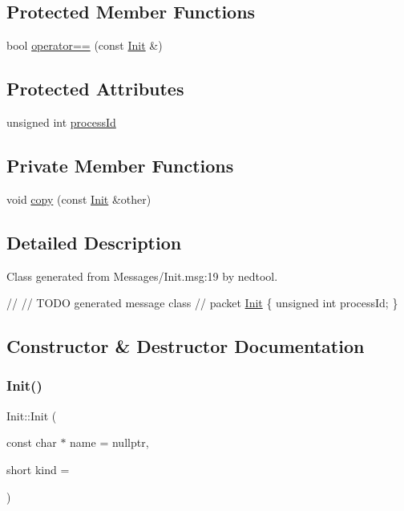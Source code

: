 \subsection*{Protected Member Functions}
\begin{DoxyCompactItemize}
\item 
bool \hyperlink{class_init_a474b7c9ffdf72a6b2b58558ce68bb03e}{operator==} (const \hyperlink{class_init}{Init} \&)
\end{DoxyCompactItemize}
\subsection*{Protected Attributes}
\begin{DoxyCompactItemize}
\item 
unsigned int \hyperlink{class_init_a3adbaa4c454127a34eaab69297b44585}{process\+Id}
\end{DoxyCompactItemize}
\subsection*{Private Member Functions}
\begin{DoxyCompactItemize}
\item 
void \hyperlink{class_init_a045745f591e312608e5ee3639f4459ba}{copy} (const \hyperlink{class_init}{Init} \&other)
\end{DoxyCompactItemize}


\subsection{Detailed Description}
Class generated from {\ttfamily Messages/\+Init.\+msg\+:19} by nedtool. 


\begin{DoxyPre}
//
// TODO generated message class
//
packet \hyperlink{class_init}{Init}
\{
    unsigned int processId;
\}
\end{DoxyPre}
 

\subsection{Constructor \& Destructor Documentation}
\mbox{\label{class_init_a763a386107f8ea21acfd24f243e0f73c}} 
\subsubsection{\texorpdfstring{Init()}{Init()}\hspace{0.1cm}{\footnotesize\ttfamily [1/2]}}
{\footnotesize\ttfamily Init\+::\+Init (\begin{DoxyParamCaption}\item[{const char $\ast$}]{name = {\ttfamily nullptr},  }\item[{short}]{kind = {} }\end{DoxyParamCaption})}

